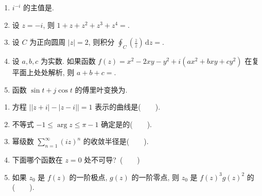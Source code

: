 \documentclass[simple]{hfutexam}
\newcommand{\diff}{\,\mathrm{d}}
\begin{document}
\ZhuanYeBanJi{}
\maketitle

\begin{enumerate}
\item $i^{-i}$ 的主值是\fillblankframe{}.
\item 设 $z=-i$, 则 $1+z+z^2+z^3+z^4=$\fillblankframe{}.
\item 设 $C$ 为正向圆周 $|z|=2$, 则积分 $\displaystyle\oint_C\left(\frac{\overline z}{z}\right)\diff z=$\fillblankframe{}.
\item 设 $a,b,c$ 为实数. 如果函数 $f(z)=x^2-2xy-y^2+i(ax^2+bxy+cy^2)$ 在复平面上处处解析, 则 $a+b+c=$\fillblankframe{}.
\item 函数 $\sin t+j\cos t$ 的傅里叶变换为\fillblankframe{}.
\end{enumerate}

\begin{enumerate}
\item 方程 $\bigl||z+i|-|z-i|\bigr|=1$ 表示的曲线是(~~~~).
\item 不等式 $-1\le\arg z\le \pi-1$ 确定是的(~~~~).
\item 幂级数 $\displaystyle\sum_{n=1}^\infty (iz)^n$ 的收敛半径是(~~~~).
\item 下面哪个函数在 $z=0$ 处不可导?~(~~~~)
\item 如果 $z_0$ 是 $f(z)$ 的一阶极点, $g(z)$ 的一阶零点, 则 $z_0$ 是 $f(z)^3g(z)^2$ 的(~~~~).
\end{enumerate}
\end{document}
